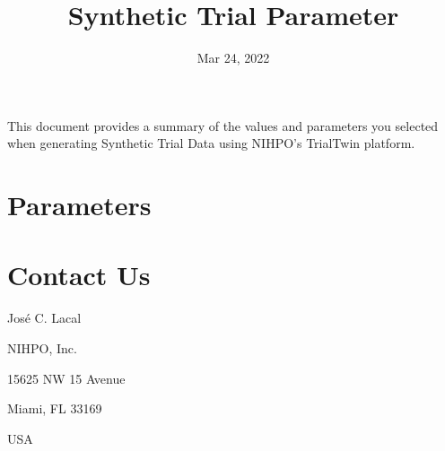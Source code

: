 \documentclass[letterpaper,10pt,english]{sphinxhowto}
\title{Synthetic Trial Parameter}
\date{Mar 24, 2022}
\author{}
\begin{document}
\pagestyle{empty}
\sphinxmaketitle
\pagestyle{plain}
\sphinxtableofcontents
\pagestyle{normal}
\label{\detokenize{index::doc}}


\sphinxAtStartPar
This document provides a summary of the values and parameters you selected when generating Synthetic Trial Data
using NIHPO’s TrialTwin platform.


\section{Parameters}
\label{\detokenize{parameters:parameters}}\label{\detokenize{parameters::doc}}
\newpage


\section{Contact Us}
\label{\detokenize{contact_us:contact-us}}\label{\detokenize{contact_us::doc}}
\begin{DUlineblock}{0em}
\item[] José C. Lacal
\item[] NIHPO, Inc.
\item[] 15625 NW 15 Avenue
\item[] Miami, FL 33169
\item[] USA
\item[] 
\end{DUlineblock}



\renewcommand{\indexname}{Index}
\printindex
\end{document}
